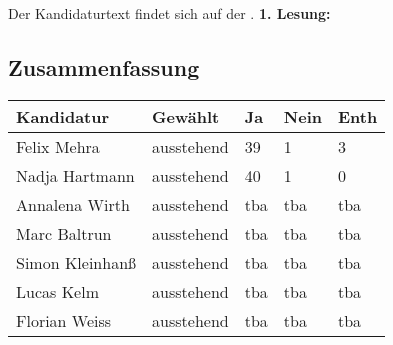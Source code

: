 {
    Der Kandidaturtext findet sich auf der \kandidaturenseite.
}{
	\textbf{1. Lesung:}
	\ul{}
}

\subsection{Zusammenfassung}
\begin{center}
    \begin{tabular}{|p{6cm}|m{2cm}|m{1cm}|m{1cm}|m{1cm}|}
        \hline
        Kandidatur & Gewählt & Ja & Nein & Enth\\\hline
        Felix Mehra & ausstehend & 39 & 1 & 3 \\\hline
		Nadja Hartmann & ausstehend & 40 & 1 & 0 \\\hline
		Annalena Wirth & ausstehend & tba & tba & tba \\\hline
		Marc Baltrun & ausstehend & tba & tba & tba \\\hline
		Simon Kleinhanß & ausstehend & tba & tba & tba \\\hline
		Lucas Kelm & ausstehend & tba & tba & tba \\\hline
		Florian Weiss & ausstehend & tba & tba & tba \\\hline
    \end{tabular}
\end{center}